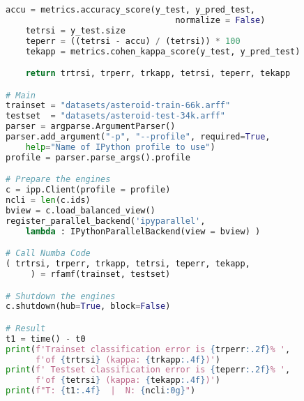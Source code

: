 \begin{lstlisting}[language=Python, caption={Parallel Numba-CPU implementation of the RF test case.}]
    accu = metrics.accuracy_score(y_test, y_pred_test, 
                                  normalize = False)
    tetrsi = y_test.size
    teperr = ((tetrsi - accu) / (tetrsi)) * 100
    tekapp = metrics.cohen_kappa_score(y_test, y_pred_test)

    return trtrsi, trperr, trkapp, tetrsi, teperr, tekapp

# Main
trainset = "datasets/asteroid-train-66k.arff"
testset  = "datasets/asteroid-test-34k.arff"
parser = argparse.ArgumentParser()
parser.add_argument("-p", "--profile", required=True,
    help="Name of IPython profile to use")
profile = parser.parse_args().profile

# Prepare the engines
c = ipp.Client(profile = profile)
ncli = len(c.ids)
bview = c.load_balanced_view()
register_parallel_backend('ipyparallel',
    lambda : IPythonParallelBackend(view = bview) )

# Call Numba Code
( trtrsi, trperr, trkapp, tetrsi, teperr, tekapp,
     ) = rfamf(trainset, testset)

# Shutdown the engines
c.shutdown(hub=True, block=False)

# Result
t1 = time() - t0
print(f'Trainset classification error is {trperr:.2f}% ',
      f'of {trtrsi} (kappa: {trkapp:.4f})')
print(f' Testset classification error is {teperr:.2f}% ',
      f'of {tetrsi} (kappa: {tekapp:.4f})')
print(f"T: {t1:.4f}  |  N: {ncli:0g}")
\end{lstlisting}
